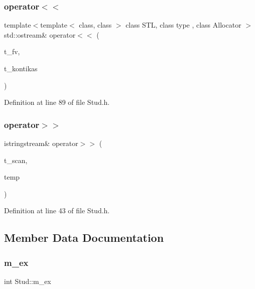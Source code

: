\subsubsection{\texorpdfstring{operator$<$$<$}{operator<<}}
{\footnotesize\ttfamily template$<$template$<$ class, class $>$ class S\+TL, class type , class Allocator $>$ \\
std\+::ostream\& operator$<$$<$ (\begin{DoxyParamCaption}\item[{std\+::ostream \&}]{t\+\_\+fv,  }\item[{S\+TL$<$ type, Allocator $>$ \&}]{t\+\_\+kontikas }\end{DoxyParamCaption})\hspace{0.3cm}{\ttfamily [friend]}}



Definition at line 89 of file Stud.\+h.

\mbox{\label{class_stud_a71505fcbc6a3d59bd212b89b478962ce}} 
\subsubsection{\texorpdfstring{operator$>$$>$}{operator>>}}
{\footnotesize\ttfamily istringstream\& operator$>$$>$ (\begin{DoxyParamCaption}\item[{std\+::istringstream \&}]{t\+\_\+scan,  }\item[{\mbox{\hyperlink{class_stud}{Stud}} \&}]{temp }\end{DoxyParamCaption})\hspace{0.3cm}{\ttfamily [friend]}}



Definition at line 43 of file Stud.\+h.



\subsection{Member Data Documentation}
\mbox{\label{class_stud_a5f52cca0a5786042eac89aba670c0bb7}} 
\subsubsection{\texorpdfstring{m\_ex}{m\_ex}}
{\footnotesize\ttfamily int Stud\+::m\+\_\+ex\hspace{0.3cm}{\ttfamily [private]}}



